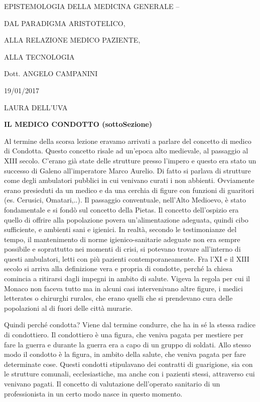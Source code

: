 \documentclass[]{article}
\date{}
\begin{document}
EPISTEMOLOGIA DELLA MEDICINA GENERALE --

DAL PARADIGMA ARISTOTELICO,

ALLA RELAZIONE MEDICO PAZIENTE,

ALLA TECNOLOGIA

Dott. ANGELO CAMPANINI

19/01/2017

LAURA DELL'UVA

\textbf{IL MEDICO CONDOTTO (sottoSezione)}

Al termine della scorsa lezione eravamo arrivati a parlare del concetto
di medico di Condotta. Questo concetto risale ad un'epoca alto
medievale, al passaggio al XIII secolo. C'erano già state delle
strutture presso l'impero e questo era stato un successo di Galeno
all'imperatore Marco Aurelio. Di fatto si parlava di strutture come
degli ambulatori pubblici in cui venivano curati i non abbienti.
Ovviamente erano presieduti da un medico e da una cerchia di figure con
funzioni di guaritori (es. Cerusici, Omatari,..). Il passaggio
conventuale, nell'Alto Medioevo, è stato fondamentale e si fondò sul
concetto della Pietas. Il concetto dell'ospizio era quello di offrire
alla popolazione povera un'alimentazione adeguata, quindi cibo
sufficiente, e ambienti sani e igienici. In realtà, secondo le
testimonianze del tempo, il mantenimento di norme igienico-sanitarie
adeguate non era sempre possibile e soprattutto nei momenti di crisi, si
potevano trovare all'interno di questi ambulatori, letti con più
pazienti contemporaneamente. Fra l'XI e il XIII secolo si arriva alla
definizione vera e propria di condotte, perché la chiesa comincia a
ritirarsi dagli impegni in ambito di salute. Vigeva la regola per cui il
Monaco non faceva tutto ma in alcuni casi intervenivano altre figure, i
medici letterates o chirurghi rurales, che erano quelli che si
prendevano cura delle popolazioni al di fuori delle città murarie.

Quindi perché condotta? Viene dal termine condurre, che ha in sé la
stessa radice di condottiero. Il condottiero è una figura, che veniva
pagata per mestiere per fare la guerra e durante la guerra era a capo di
un gruppo di soldati. Allo stesso modo il condotto è la figura, in
ambito della salute, che veniva pagata per fare determinate cose. Questi
condotti stipulavano dei contratti di guarigione, sia con le strutture
comunali, ecclesiastiche, ma anche con i pazienti stessi, attraverso cui
venivano pagati. Il concetto di valutazione dell'operato sanitario di un
professionista in un certo modo nasce in questo momento.
\end{document}
